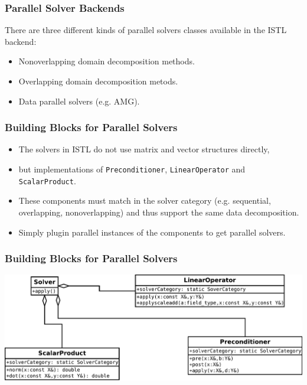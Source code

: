 {\begin{frame}
  \frametitle<presentation>{Parallel Solver Backends}
  
  There are three different kinds of parallel solvers classes
  available in the ISTL backend:
  \begin{itemize}
  \item Nonoverlapping domain decomposition
    methods.
  \item Overlapping domain decomposition metods.
  \item Data parallel solvers (e.g. AMG).
  \end{itemize}
\end{frame}

\begin{frame}
  \frametitle{Building Blocks for Parallel Solvers}

  \begin{itemize}
  \item The solvers in ISTL do not use matrix and vector structures
    directly,
  \item but implementations of \lstinline!Preconditioner!,
    \lstinline!LinearOperator! and \lstinline!ScalarProduct!.
  \item These components must match in the solver category
    (e.g. sequential, overlapping, nonoverlapping) and thus support
    the same data decomposition.
  \item Simply plugin parallel instances of the components to get
    parallel solvers.
  \end{itemize}
\end{frame}

\begin{frame}
  \frametitle<presentation>{Building Blocks for Parallel Solvers}
  \includegraphics[width=\textwidth]{EPS/istlsolver}
\end{frame}

}
